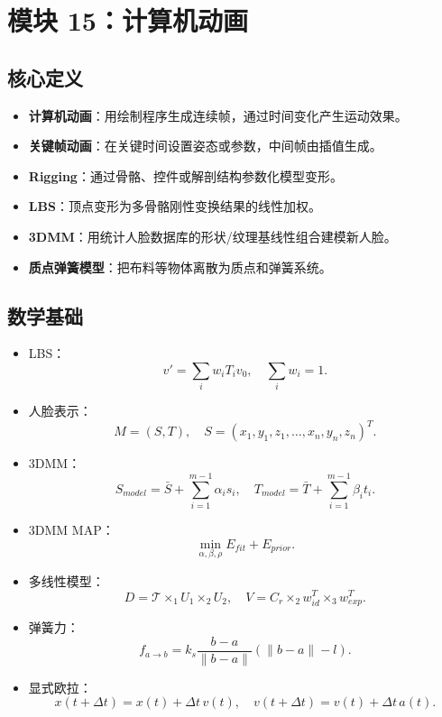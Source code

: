 \documentclass[UTF8,zihao=-4,scheme=chinese,fontset=fandol]{ctexart}
\newcommand{\key}[1]{\textbf{#1}}
\begin{document}
\section{模块 15：计算机动画}

\subsection{核心定义}
\begin{itemize}
  \item \key{计算机动画}：用绘制程序生成连续帧，通过时间变化产生运动效果。
  \item \key{关键帧动画}：在关键时间设置姿态或参数，中间帧由插值生成。
  \item \key{Rigging}：通过骨骼、控件或解剖结构参数化模型变形。
  \item \key{LBS}：顶点变形为多骨骼刚性变换结果的线性加权。
  \item \key{3DMM}：用统计人脸数据库的形状/纹理基线性组合建模新人脸。
  \item \key{质点弹簧模型}：把布料等物体离散为质点和弹簧系统。
\end{itemize}

\subsection{数学基础}
\begin{itemize}
  \item LBS：
  \[
  v'=\sum_iw_iT_iv_0,\quad \sum_iw_i=1.
  \]
  \item 人脸表示：
  \[
  M=(S,T),\quad
  S=(x_1,y_1,z_1,\ldots,x_n,y_n,z_n)^T.
  \]
  \item 3DMM：
  \[
  S_{model}=\bar S+\sum_{i=1}^{m-1}\alpha_is_i,\quad
  T_{model}=\bar T+\sum_{i=1}^{m-1}\beta_it_i.
  \]
  \item 3DMM MAP：
  \[
  \min_{\alpha,\beta,\rho}E_{fit}+E_{prior}.
  \]
  \item 多线性模型：
  \[
  D=\mathcal T\times_1U_1\times_2U_2,\quad
  V=C_r\times_2w_{id}^T\times_3w_{exp}^T.
  \]
  \item 弹簧力：
  \[
  f_{a\to b}=k_s\frac{b-a}{\|b-a\|}(\|b-a\|-l).
  \]
  \item 显式欧拉：
  \[
  x(t+\Delta t)=x(t)+\Delta t\,v(t),\quad
  v(t+\Delta t)=v(t)+\Delta t\,a(t).
  \]
\end{itemize}
\end{document}
